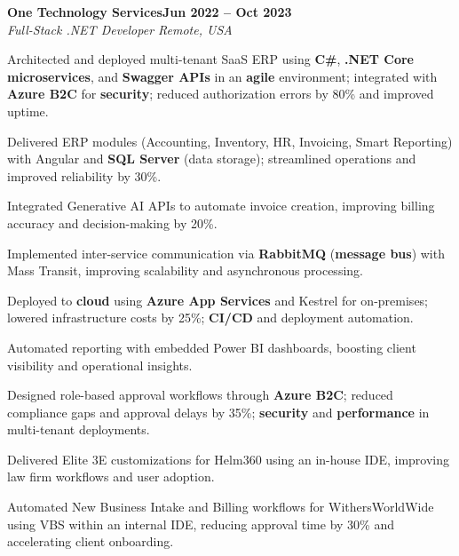 \documentclass[letterpaper,10pt]{article}
\newcommand{\headingBf}[2]{
  \hspace{10pt}\textbf{#1}\hfill\textbf{#2}\\
}
\newcommand{\headingIt}[2]{
  \hspace{10pt}\textit{#1}\hfill\textit{#2}\\
}
\newenvironment{resume_list}{
  \vspace{-7pt}
  \begin{itemize}[itemsep=-2px, parsep=1pt, leftmargin=30pt]
}{
  \end{itemize}
}
\begin{document}
\headingBf{One Technology Services}{Jun 2022 -- Oct 2023}
\headingIt{Full-Stack .NET Developer \hfill Remote, USA}{}
\begin{resume_list}
    \item Architected and deployed multi-tenant SaaS ERP using \textbf{C\#}, \textbf{.NET Core microservices}, and \textbf{Swagger APIs} in an \textbf{agile} environment; integrated with \textbf{Azure B2C} for \textbf{security}; reduced authorization errors by 80\% and improved uptime.
    \item Delivered ERP modules (Accounting, Inventory, HR, Invoicing, Smart Reporting) with Angular and \textbf{SQL Server} (data storage); streamlined operations and improved reliability by 30\%.
    \item Integrated Generative AI APIs to automate invoice creation, improving billing accuracy and decision-making by 20\%.
    \item Implemented inter-service communication via \textbf{RabbitMQ} (\textbf{message bus}) with Mass Transit, improving scalability and asynchronous processing.
    \item Deployed to \textbf{cloud} using \textbf{Azure App Services} and Kestrel for on-premises; lowered infrastructure costs by 25\%; \textbf{CI/CD} and deployment automation.
    \item Automated reporting with embedded Power BI dashboards, boosting client visibility and operational insights.
    \item Designed role-based approval workflows through \textbf{Azure B2C}; reduced compliance gaps and approval delays by 35\%; \textbf{security} and \textbf{performance} in multi-tenant deployments.
    \item Delivered Elite 3E customizations for Helm360 using an in-house IDE, improving law firm workflows and user adoption.
    \item Automated New Business Intake and Billing workflows for WithersWorldWide using VBS within an internal IDE, reducing approval time by 30\% and accelerating client onboarding.
\end{resume_list}
\end{document}
